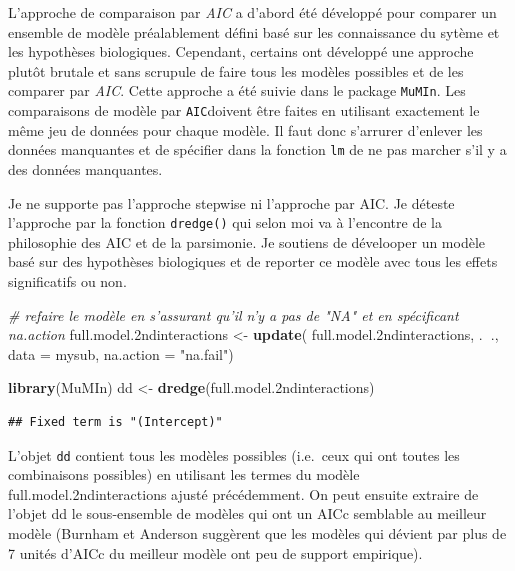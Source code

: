 \documentclass[12pt,]{book}
\makeatletter
\newenvironment{Shaded}{\begin{snugshade}}{\end{snugshade}}
\newcommand{\CommentTok}[1]{\textcolor[rgb]{0.56,0.35,0.01}{\textit{#1}}}
\newcommand{\DataTypeTok}[1]{\textcolor[rgb]{0.13,0.29,0.53}{#1}}
\newcommand{\FloatTok}[1]{\textcolor[rgb]{0.00,0.00,0.81}{#1}}
\newcommand{\KeywordTok}[1]{\textcolor[rgb]{0.13,0.29,0.53}{\textbf{#1}}}
\newcommand{\NormalTok}[1]{#1}
\newcommand{\OperatorTok}[1]{\textcolor[rgb]{0.81,0.36,0.00}{\textbf{#1}}}
\newcommand{\StringTok}[1]{\textcolor[rgb]{0.31,0.60,0.02}{#1}}
\newenvironment{kframe}{%
\medskip{}
\setlength{\fboxsep}{.8em}
\def\at@end@of@kframe{}%
\ifinner\ifhmode%
 \def\at@end@of@kframe{\end{minipage}}%
 \begin{minipage}{\columnwidth}%
\fi\fi%
\def\FrameCommand##1{\hskip\@totalleftmargin \hskip-\fboxsep
\colorbox{incolor}{##1}\hskip-\fboxsep
    \hskip-\linewidth \hskip-\@totalleftmargin \hskip\columnwidth}%
\MakeFramed {\advance\hsize-\width
  \@totalleftmargin\z@ \linewidth\hsize
  \@setminipage}}%
{\par\unskip\endMakeFramed%
\at@end@of@kframe}
\newenvironment{rmdblock}[1]
 {
 \begin{itemize}
 \renewcommand{\labelitemi}{
   \raisebox{-.7\height}[0pt][0pt]{
     {\setkeys{Gin}{width=3em,keepaspectratio}\texttt{[image: images/\#1]}}
   }
 }
 \begin{kframe}
 \setlength{\fboxsep}{1em}
 \item
 }
 {
 \end{kframe}
 \end{itemize}
 }
\newenvironment{rmdnote}
  {\begin{rmdblock}{note}}
  {\end{rmdblock}}
\makeatother
\begin{document}
L'approche de comparaison par \emph{AIC} a d'abord été développé pour comparer un ensemble de modèle préalablement défini basé sur les connaissance du sytème et les hypothèses biologiques. Cependant, certains ont développé une approche plutôt brutale et sans scrupule de faire tous les modèles possibles et de les comparer par \emph{AIC}. Cette approche a été suivie dans le package \texttt{MuMIn}. Les comparaisons de modèle par \texttt{AIC}doivent être faites en utilisant exactement le même jeu de données pour chaque modèle.
Il faut donc s'arrurer d'enlever les données manquantes et de spécifier dans la fonction \texttt{lm} de ne pas marcher s'il y a des données manquantes.

\begin{rmdnote}
Je ne supporte pas l'approche stepwise ni l'approche par AIC. Je déteste l'approche par la fonction \texttt{dredge()} qui selon moi va à l'encontre de la philosophie des AIC et de la parsimonie. Je soutiens de dévelooper un modèle basé sur des hypothèses biologiques et de reporter ce modèle avec tous les effets significatifs ou non.
\end{rmdnote}

\begin{Shaded}
\begin{Highlighting}[]
\CommentTok{# refaire le modèle en s'assurant qu'il n'y a pas de "NA" et en spécificant na.action}
\NormalTok{full.model}\FloatTok{.2}\NormalTok{ndinteractions <-}\StringTok{ }\KeywordTok{update}\NormalTok{(}
\NormalTok{  full.model}\FloatTok{.2}\NormalTok{ndinteractions,}
\NormalTok{  .}\OperatorTok{~}\NormalTok{.,}
  \DataTypeTok{data =}\NormalTok{ mysub,}
  \DataTypeTok{na.action =} \StringTok{"na.fail"}\NormalTok{)}

\KeywordTok{library}\NormalTok{(MuMIn)}
\NormalTok{dd <-}\StringTok{ }\KeywordTok{dredge}\NormalTok{(full.model}\FloatTok{.2}\NormalTok{ndinteractions)}
\end{Highlighting}
\end{Shaded}

\begin{verbatim}
## Fixed term is "(Intercept)"
\end{verbatim}

L'objet \texttt{dd} contient tous les modèles possibles (i.e.~ceux qui ont toutes les combinaisons possibles) en utilisant les termes du modèle full.model.2ndinteractions ajusté précédemment. On peut ensuite extraire de l'objet dd le sous-ensemble de modèles qui ont un AICc semblable au meilleur modèle (Burnham et Anderson suggèrent que les modèles qui dévient par plus de 7 unités d'AICc du meilleur modèle ont peu de support empirique).
\end{document}
